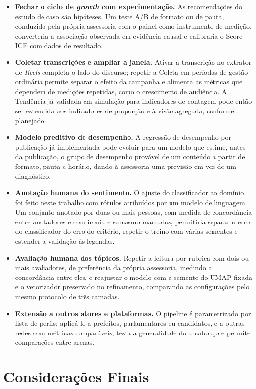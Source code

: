 \begin{itemize}
    \item \textbf{Fechar o ciclo de \emph{growth} com experimentação.} As recomendações do estudo de caso são hipóteses. Um teste A/B de formato ou de pauta, conduzido pela própria assessoria com o painel como instrumento de medição, converteria a associação observada em evidência causal e calibraria o Score ICE com dados de resultado.
    \item \textbf{Coletar transcrições e ampliar a janela.} Ativar a transcrição no extrator de \emph{Reels} completa o lado do discurso; repetir a Coleta em períodos de gestão ordinária permite separar o efeito da campanha e alimenta as métricas que dependem de medições repetidas, como o crescimento de audiência. A Tendência já validada em simulação para indicadores de contagem pode então ser estendida aos indicadores de proporção e à visão agregada, conforme planejado.
    \item \textbf{Modelo preditivo de desempenho.} A regressão de desempenho por publicação já implementada pode evoluir para um modelo que estime, antes da publicação, o grupo de desempenho provável de um conteúdo a partir de formato, pauta e horário, dando à assessoria uma previsão em vez de um diagnóstico.
    \item \textbf{Anotação humana do sentimento.} O ajuste do classificador ao domínio foi feito neste trabalho com rótulos atribuídos por um modelo de linguagem. Um conjunto anotado por duas ou mais pessoas, com medida de concordância entre anotadores e com ironia e sarcasmo marcados, permitiria separar o erro do classificador do erro do critério, repetir o treino com várias sementes e estender a validação às legendas.
    \item \textbf{Avaliação humana dos tópicos.} Repetir a leitura por rubrica com dois ou mais avaliadores, de preferência da própria assessoria, medindo a concordância entre eles, e reajustar o modelo com a semente do UMAP fixada e o vetorizador preservado no refinamento, comparando as configurações pelo mesmo protocolo de três camadas.
    \item \textbf{Extensão a outros atores e plataformas.} O pipeline é parametrizado por lista de perfis; aplicá-lo a prefeitos, parlamentares ou candidatos, e a outras redes com métricas comparáveis, testa a generalidade do arcabouço e permite comparações entre arenas.
\end{itemize}

\section{Considerações Finais}

